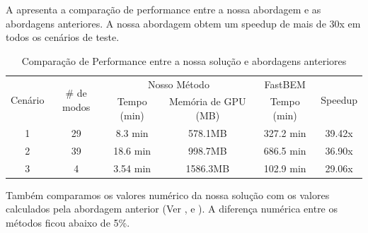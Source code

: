 A  apresenta a comparação de performance entre a nossa abordagem e as abordagens anteriores. A nossa abordagem obtem um speedup de mais de 30x em todos os cenários de teste.

\begin{table}[ht]
\begin{center}
\begin{tabular}{c|c|c c|c|c}
\multirow{2}{*}{Cenário}& \multirow{2}{*}{\# de modos} & \multicolumn{2}{c|}{Nosso Método} & FastBEM & \multirow{2}{*}{Speedup}\\
\cline{3-5}
& & Tempo (min) & Memória de GPU (MB) & Tempo (min)\\
\hline 
1 & 29 & 8.3 min & 578.1MB & 327.2 min & 39.42x\\
2 & 39 & 18.6 min & 998.7MB & 686.5 min & 36.90x\\
3 & 4 & 3.54 min & 1586.3MB & 102.9 min & 29.06x
\end{tabular}
\end{center}
\caption{Comparação de Performance entre a nossa solução e abordagens anteriores}\label{tab:benchmark_timings}
\end{table}

Também comparamos os valores numérico da nossa solução com os valores calculados pela abordagem anterior (Ver ,  e ). A diferença numérica entre os métodos ficou abaixo de 5\%.

